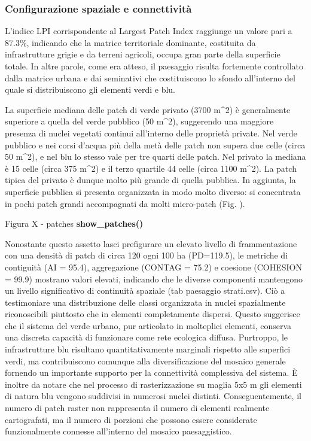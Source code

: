 \documentclass[
  a4paper,
]{book}
\begin{document}
\subsubsection{Configurazione spaziale e connettività}\label{configurazione-spaziale-e-connettivituxe0}

L'indice LPI corrispondente al Largest Patch Index raggiunge un valore pari a 87.3\%, indicando che la matrice territoriale dominante, costituita da infrastrutture grigie e da terreni agricoli, occupa gran parte della superficie totale.
In altre parole, come era atteso, il paesaggio risulta fortemente controllato dalla matrice urbana e dai seminativi che costituiscono lo sfondo all'interno del quale si distribuiscono gli elementi verdi e blu.

La superficie mediana delle patch di verde privato (3700 m\^{}2) è generalmente superiore a quella del verde pubblico (50 m\^{}2), suggerendo una maggiore presenza di nuclei vegetati continui all'interno delle proprietà private.
Nel verde pubblico e nei corsi d'acqua più della metà delle patch non supera due celle (circa 50 m\^{}2), e nel blu lo stesso vale per tre quarti delle patch.
Nel privato la mediana è 15 celle (circa 375 m\^{}2) e il terzo quartile 44 celle (circa 1100 m\^{}2).
La patch tipica del privato è dunque molto più grande di quella pubblica.
In aggiunta, la superficie pubblica si presenta organizzata in modo molto diverso: si concentrata in pochi patch grandi accompagnati da molti micro-patch (Fig. ).

Figura X - patches \textbf{show\_patches()}

Nonostante questo assetto lasci prefigurare un elevato livello di frammentazione con una densità di patch di circa 120 ogni 100 ha (PD=119.5), le metriche di contiguità (AI = 95.4), aggregazione (CONTAG = 75.2) e coesione (COHESION = 99.9) mostrano valori elevati, indicando che le diverse componenti mantengono un livello significativo di continuità spaziale (tab paesaggio strati.csv).
Ciò a testimoniare una distribuzione delle classi organizzata in nuclei spazialmente riconoscibili piuttosto che in elementi completamente dispersi.
Questo suggerisce che il sistema del verde urbano, pur articolato in molteplici elementi, conserva una discreta capacità di funzionare come rete ecologica diffusa.
Purtroppo, le infrastrutture blu risultano quantitativamente marginali rispetto alle superfici verdi, ma contribuiscono comunque alla diversificazione del mosaico generale fornendo un importante supporto per la connettività complessiva del sistema.
È inoltre da notare che nel processo di rasterizzazione su maglia 5x5 m gli elementi di natura blu vengono suddivisi in numerosi nuclei distinti.
Conseguentemente, il numero di patch raster non rappresenta il numero di elementi realmente cartografati, ma il numero di porzioni che possono essere considerate funzionalmente connesse all'interno del mosaico paesaggistico.
\end{document}
